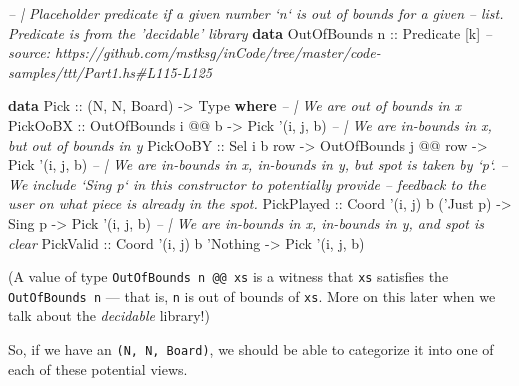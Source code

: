 \documentclass[]{article}
\newenvironment{Shaded}{}{}
\newcommand{\CommentTok}[1]{\textcolor[rgb]{0.38,0.63,0.69}{\textit{#1}}}
\newcommand{\DataTypeTok}[1]{\textcolor[rgb]{0.56,0.13,0.00}{#1}}
\newcommand{\FunctionTok}[1]{\textcolor[rgb]{0.02,0.16,0.49}{#1}}
\newcommand{\KeywordTok}[1]{\textcolor[rgb]{0.00,0.44,0.13}{\textbf{#1}}}
\newcommand{\NormalTok}[1]{#1}
\newcommand{\OtherTok}[1]{\textcolor[rgb]{0.00,0.44,0.13}{#1}}
\begin{document}
\begin{Shaded}
\begin{Highlighting}[]
\CommentTok{-- | Placeholder predicate if a given number `n` is out of bounds for a given}
\CommentTok{-- list.  Predicate is from the 'decidable' library}
\KeywordTok{data} \DataTypeTok{OutOfBounds}\OtherTok{ n ::} \DataTypeTok{Predicate}\NormalTok{ [k]}
\CommentTok{-- source: https://github.com/mstksg/inCode/tree/master/code-samples/ttt/Part1.hs#L115-L125}

\KeywordTok{data} \DataTypeTok{Pick}\OtherTok{ ::}\NormalTok{ (}\DataTypeTok{N}\NormalTok{, }\DataTypeTok{N}\NormalTok{, }\DataTypeTok{Board}\NormalTok{) }\OtherTok{->} \DataTypeTok{Type} \KeywordTok{where}
    \CommentTok{-- | We are out of bounds in x}
    \DataTypeTok{PickOoBX}\OtherTok{   ::} \DataTypeTok{OutOfBounds}\NormalTok{ i }\FunctionTok{@@}\NormalTok{ b                         }\OtherTok{->} \DataTypeTok{Pick}\NormalTok{ '(i, j, b)}
    \CommentTok{-- | We are in-bounds in x, but out of bounds in y}
    \DataTypeTok{PickOoBY}\OtherTok{   ::} \DataTypeTok{Sel}\NormalTok{ i b row        }\OtherTok{->} \DataTypeTok{OutOfBounds}\NormalTok{ j }\FunctionTok{@@}\NormalTok{ row }\OtherTok{->} \DataTypeTok{Pick}\NormalTok{ '(i, j, b)}
    \CommentTok{-- | We are in-bounds in x, in-bounds in y, but spot is taken by `p`.}
    \CommentTok{-- We include `Sing p` in this constructor to potentially provide}
    \CommentTok{-- feedback to the user on what piece is already in the spot.}
    \DataTypeTok{PickPlayed}\OtherTok{ ::} \DataTypeTok{Coord}\NormalTok{ '(i, j) b ('}\DataTypeTok{Just}\NormalTok{ p) }\OtherTok{->} \DataTypeTok{Sing}\NormalTok{ p        }\OtherTok{->} \DataTypeTok{Pick}\NormalTok{ '(i, j, b)}
    \CommentTok{-- | We are in-bounds in x, in-bounds in y, and spot is clear}
    \DataTypeTok{PickValid}\OtherTok{  ::} \DataTypeTok{Coord}\NormalTok{ '(i, j) b '}\DataTypeTok{Nothing}                   \OtherTok{->} \DataTypeTok{Pick}\NormalTok{ '(i, j, b)}
\end{Highlighting}
\end{Shaded}

(A value of type \texttt{OutOfBounds\ n\ @@\ xs} is a witness that \texttt{xs}
satisfies the \texttt{OutOfBounds\ n} --- that is, \texttt{n} is out of bounds
of \texttt{xs}. More on this later when we talk about the \emph{decidable}
library!)

So, if we have an \texttt{(N,\ N,\ Board)}, we should be able to categorize it
into one of each of these potential views.
\end{document}
